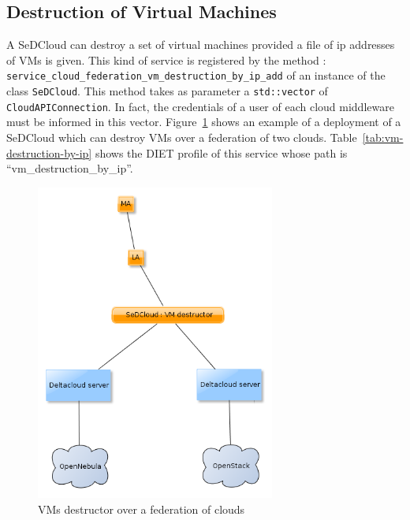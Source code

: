 \subsection{Destruction of Virtual Machines}

A SeDCloud can destroy a set of virtual machines provided a file of ip
addresses of VMs is given. This kind of service is registered by the
method
:\\ \texttt{service\_cloud\_federation\_vm\_destruction\_by\_ip\_add}
of an instance of the class \texttt{SeDCloud}. This method takes as
parameter a \texttt{std::vector} of \texttt{CloudAPIConnection}.  In
fact, the credentials of a user of each cloud middleware must be
informed in this vector. Figure~\ref{fig:SeDCloudDestructor} shows an
example of a deployment of a SeDCloud which can destroy VMs over a
federation of two clouds.  Table~\ref{tab:vm-destruction-by-ip} shows
the DIET profile of this service whose path is
``vm\_destruction\_by\_ip''.

\begin{figure}[h!]
 \begin{center}
 \includegraphics[width=0.7\textwidth]{fig/SeDCloudVMDestructor}
  \caption{VMs destructor over a federation of clouds}
  \label{fig:SeDCloudDestructor}
 \end{center}
\end{figure}


